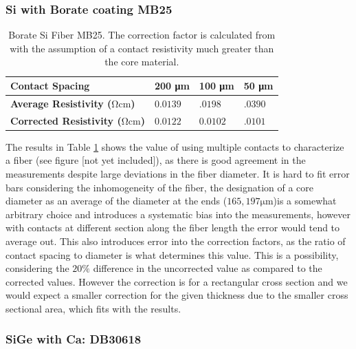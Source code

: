 \subsubsection{Si with Borate coating MB25}

\begin{table}[!h]
\begin{center}
\begin{tabular}{ | l | l | l | l |}
\hline
\textbf{Contact Spacing}&\textbf{200 \si{\micro \meter}} & \textbf{100 \si{\micro \meter}} & \textbf{50 \si{\micro \meter}} \\ \hline
\textbf{Average Resistivity ($\si{\ohm \cm}$)}&$0.0139$& $.0198$&$.0390$\\\hline
\textbf{Corrected Resistivity ($\si{\ohm \cm}$)}&0$.0122$& $0.0102$ &$.0101$\\\hline
\end{tabular}
\end{center}
\caption{Borate Si Fiber MB25. The correction factor is calculated from \cite{Zimney2007CorrectionStudy} with the assumption of a contact resistivity much greater than the core material.}
\label{Tabmb25}
\end{table}

The results in Table \ref{Tabmb25} shows the value of using multiple contacts to characterize a fiber (see figure [not yet included]), as there is good agreement in the measurements despite large deviations in the fiber diameter. It is hard to fit error bars considering the inhomogeneity of the fiber, the designation of a core diameter as an average of the diameter at the ends ($165, 197 \si{\micro\meter}$)is a somewhat arbitrary choice and introduces a systematic bias into the measurements, however with contacts at different section along the fiber length the error would tend to average out. This also introduces error into the correction factors, as the ratio of contact spacing to diameter is what determines this value. This is a possibility, considering the $20\%$ difference in the uncorrected value as compared to the corrected values. However the correction is for a rectangular cross section and we would expect a smaller correction for the given thickness due to the smaller cross sectional area, which fits with the results. 



\FloatBarrier
\subsubsection{SiGe with Ca: DB30618}


